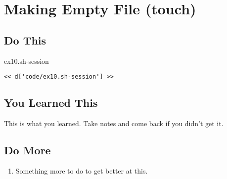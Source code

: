 \chapter{Making Empty File (touch)}

\section{Do This}

\begin{code}{ex10.sh-session}
\begin{Verbatim}
<< d['code/ex10.sh-session'] >>
\end{Verbatim}
\end{code}


\section{You Learned This}

This is what you learned.  Take notes and come back if you didn't get it.

\section{Do More}

\begin{enumerate}
\item Something more to do to get better at this.
\end{enumerate}

